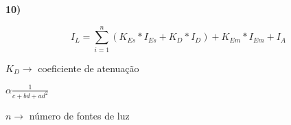 \textbf{10)} 

\begin{equation}
    I_L = \sum_{i = 1}^{n} (K_{Es}*I_{Es}+K_D*I_D) + K_{Em}*I_{Em}+I_A 
\end{equation}

$K_D \rightarrow$ coeficiente de atenuação

$\alpha \frac{1}{c+bd+ad^{2}}$

$n \rightarrow$ número de fontes de luz 


